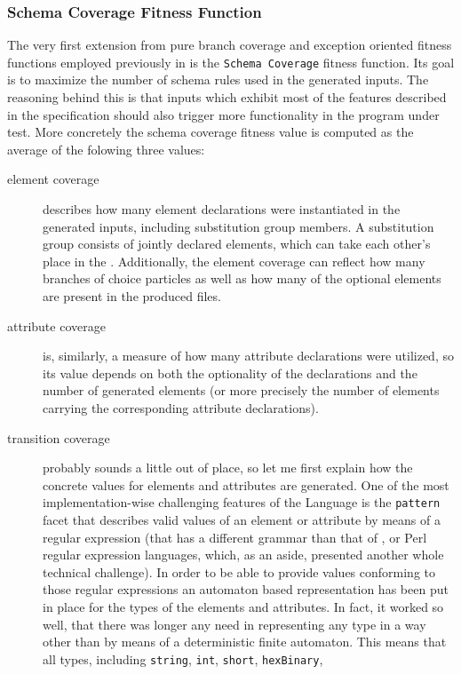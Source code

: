 \subsubsection{Schema Coverage Fitness Function}
\label{sec:fit:schema}
The very first extension from pure \java branch coverage and exception oriented fitness functions employed 
previously in \xmlmate is the \texttt{Schema Coverage} fitness function. Its goal is to maximize the number 
of schema rules used in the generated inputs. The reasoning behind this is that inputs which exhibit most of 
the features described in the specification should also trigger more functionality in the program under test. 
More concretely the schema coverage fitness value is computed as the average of the folowing three values:
\begin{description}
  \item[element coverage] describes how many element declarations were instantiated in the generated inputs, 
  including substitution group members. A substitution group consists of jointly declared elements, which 
  can take each other's place in the \xml. Additionally, the element coverage can reflect how many branches 
  of choice particles as well as how many of the optional elements are present in the produced files.
  \item[attribute coverage] is, similarly, a measure of how many attribute declarations were utilized, so its 
  value depends on both the optionality of the declarations and the number of generated elements (or more 
  precisely the number of elements carrying the corresponding attribute declarations).
  \item[transition coverage] probably sounds a little out of place, so let me first explain how the concrete 
  values for elements and attributes are generated. One of the most implementation-wise challenging features 
  of the \xsd{} {\small Language} is the \texttt{pattern} facet that describes valid values of an element or 
  attribute by means of a regular expression (that has a different grammar than that of \java, \python or 
  {\small Perl} regular expression languages, which, as an aside, presented another whole technical challenge). 
  In order to be able to provide values conforming to those regular expressions an automaton based representation 
  has been put in place for the types of the elements and attributes. In fact, it worked so well, that there 
  was longer any need in representing any type in a way other than by means of a deterministic finite
  automaton. This means that all types, including \texttt{string}, \texttt{int}, \texttt{short}, \texttt{hexBinary},

\end{description}

